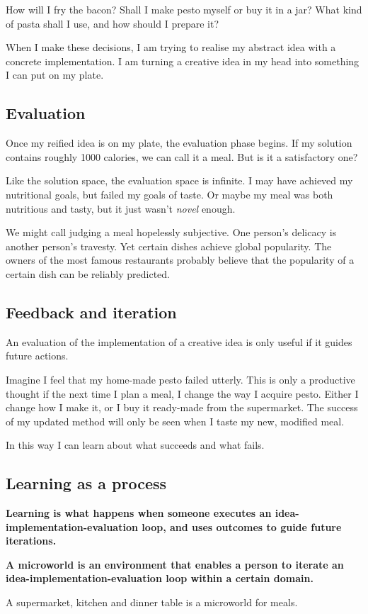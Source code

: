 How will I fry the bacon? Shall I make pesto myself or buy it in a jar?
What kind of pasta shall I use, and how should I prepare it?

When I make these decisions, I am trying to realise my abstract idea
with a concrete implementation. I am turning a creative idea in my head
into something I can put on my plate.

\subsection{Evaluation}

Once my reified idea is on my plate, the evaluation phase begins. If my
solution contains roughly 1000 calories, we can call it a meal. But is
it a satisfactory one?

Like the solution space, the evaluation space is infinite. I may have
achieved my nutritional goals, but failed my goals of taste. Or maybe my
meal was both nutritious and tasty, but it just wasn't \emph{novel}
enough.

We might call judging a meal hopelessly subjective. One person's
delicacy is another person's travesty. Yet certain dishes achieve global
popularity. The owners of the most famous restaurants probably believe
that the popularity of a certain dish can be reliably predicted.

\subsection{Feedback and iteration}

An evaluation of the implementation of a creative idea is only useful if
it guides future actions.

Imagine I feel that my home-made pesto failed utterly. This is only a
productive thought if the next time I plan a meal, I change the way I
acquire pesto. Either I change how I make it, or I buy it ready-made
from the supermarket. The success of my updated method will only be seen
when I taste my new, modified meal.

In this way I can learn about what succeeds and what fails.

\subsection{Learning as a process}

\textbf{Learning is what happens when someone executes an
idea-implementation-evaluation loop, and uses outcomes to guide future
iterations.}

\textbf{A microworld is an environment that enables a person to iterate
an idea-implementation-evaluation loop within a certain domain.}

A supermarket, kitchen and dinner table is a microworld for meals.
